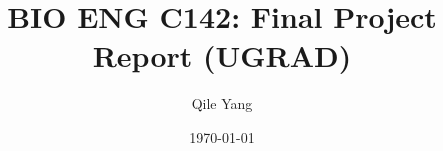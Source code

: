 \documentclass[11pt, twoside]{article}
\title{BIO ENG C142: Final Project Report (UGRAD)}
\author{Qile Yang}
\date{\today}
\begin{document}
\maketitle

\begin{abstract}
    \lipsum[1] 
\end{abstract}

\begin{multicols}{2}
    
\end{multicols}
\end{document}
